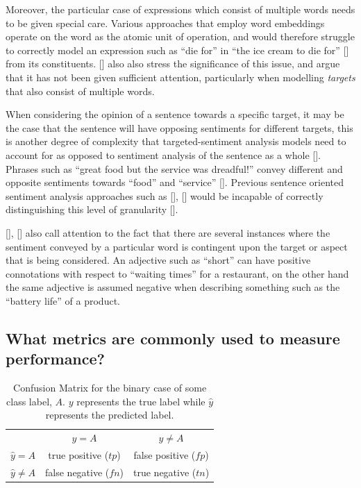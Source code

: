 \documentclass[12pt, a4paper]{report}
\theoremstyle{definition}
\theoremstyle{definition}%
\theoremstyle{definition}%
\theoremstyle{definition}%
\theoremstyle{definition}%
\theoremstyle{definition}%
\renewcommand{\cite}[1]{[\citealp{#1}]}
\begin{document}
Moreover, the particular case of expressions which consist of multiple words needs to be given special care. Various approaches that employ word embeddings operate on the word as the atomic unit of operation, and would therefore struggle to correctly model an expression such as \enquote{die for} in \enquote{the ice cream to die for} \cite{tang2016} from its constituents. \cite{zheng2018} also also stress the significance of this issue, and argue that it has not been given sufficient attention, particularly when modelling \textit{targets} that also consist of multiple words.

When considering the opinion of a sentence towards a specific target, it may be the case that the sentence will have opposing sentiments for different targets, this is another degree of complexity that targeted-sentiment analysis models need to account for as opposed to sentiment analysis of the sentence as a whole \cite{tang}. Phrases such as \enquote{great food but the service was dreadful!} convey different and opposite sentiments towards \enquote{food} and \enquote{service} \cite{tang2016}. Previous sentence oriented sentiment analysis approaches such as \cite{socher2011}, \cite{appel2016} would be incapable of correctly distinguishing this level of granularity \cite{chen2017}.

\cite{dehongma2017}, \cite{wang2018} also call attention to the fact that there are several instances where the sentiment conveyed by a particular word is contingent upon the target or aspect that is being considered. An adjective such as \enquote{short} can have positive connotations with respect to \enquote{waiting times} for a restaurant, on the other hand the same adjective is assumed negative when describing something such as the \enquote{battery life} of a product. 

\subsection{What metrics are commonly used to measure performance?}
\begin{table}[h!]
\centering
\begin{tabular}{||l c c||} 
 \hline
 & $y=A$ & $y\neq{A}$ \\ [0.5ex] 
$\hat{y}=A$ & true positive ($tp$) & false positive ($fp$) \\ 
$\hat{y}\neq{A}$ & false negative ($fn$) & true negative ($tn$) \\
 \hline
\end{tabular}
\caption{Confusion Matrix for the binary case of some class label, $A$. $y$ represents the true label while $\hat{y}$ represents the predicted label.}
\label{table:confusion_matrix}
\end{table}
\end{document}
